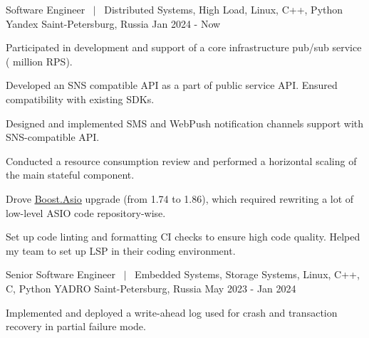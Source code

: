 

\begin{cventries}

    \cventry
    {
        Software Engineer $~\mid~$
        Distributed Systems, High Load,
        Linux, C++, Python
    } %
    {Yandex} %
    {Saint-Petersburg, Russia} %
    {Jan 2024 - Now} %
    {
        \begin{cvitems}
          \item {
              Participated in development and support of a core infrastructure pub/sub service
              ( million RPS).
          }
          \item {
              Developed an SNS compatible API as a part of public service API. Ensured compatibility
              with existing SDKs.
          }
          \item {
              Designed and implemented SMS and WebPush notification channels support with SNS-compatible API.
          }
          \item {
              Conducted a resource consumption review and performed a horizontal scaling of the main
              stateful component.
          }
          \item {
              Drove \underline{\href{https://www.boost.org/doc/libs/1_87_0/doc/html/boost_asio.html}{Boost.Asio}}
              upgrade (from 1.74 to 1.86), which required rewriting a lot of low-level ASIO code
              repository-wise.
          }
          \item {
              Set up code linting and formatting CI checks to ensure high code quality.
              Helped my team to set up LSP in their coding environment.
          }
        \end{cvitems}
    }

    \cventry
    {
        Senior Software Engineer $~\mid~$
        Embedded Systems, Storage Systems,
        Linux, C++, C, Python
    } %
    {YADRO} %
    {Saint-Petersburg, Russia} %
    {May 2023 - Jan 2024} %
    {
        \begin{cvitems}
          \item {
            Implemented and deployed a write-ahead log used for crash and transaction
            recovery in partial failure mode.
          }
        \end{cvitems}
    }


\end{cventries}
